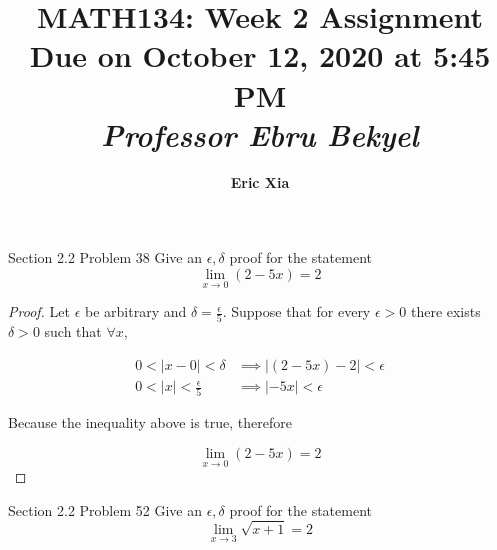 \documentclass{article}
\title{
    \vspace{2in}
    \textmd{\textbf{MATH134: Week 2 Assignment}}\\
    \normalsize\vspace{0.1in}\small{Due on October 12, 2020 at 5:45 PM}\\
    \vspace{0.1in}\large{\textit{Professor Ebru Bekyel}}
    \vspace{3in}
}
\author{\textbf{Eric Xia}}
\date{}
\begin{document}
    \maketitle
    \pagebreak


    \thispagestyle{page2}

    \begin{tbhtheorem}{Section 2.2 Problem 38}
        Give an $\epsilon,\delta$ proof for the statement
        \[
            \lim_{x\to 0} (2-5x) = 2
        \]
    \end{tbhtheorem}

    \begin{proof}
        Let $\epsilon$ be arbitrary and $\delta=\frac{\epsilon}{5}$. Suppose that for every $\epsilon>0$ there exists $\delta >0$ such that $\forall x$,

        \begin{align*}
            0 < |x-0| < \delta           & \implies |(2-5x)-2|<\epsilon \\
            0 < |x| < \frac{\epsilon}{5} & \implies |-5x| < \epsilon
        \end{align*}

        Because the inequality above is true, therefore

        \[
            \lim_{x\to 0} (2-5x) = 2
        \]
    \end{proof}


    \begin{tbhtheorem}{Section 2.2 Problem 52}
        Give an $\epsilon,\delta$ proof for the statement
        \[
            \lim_{x\to 3} \sqrt{x+1} = 2
        \]
    \end{tbhtheorem}
\end{document}
